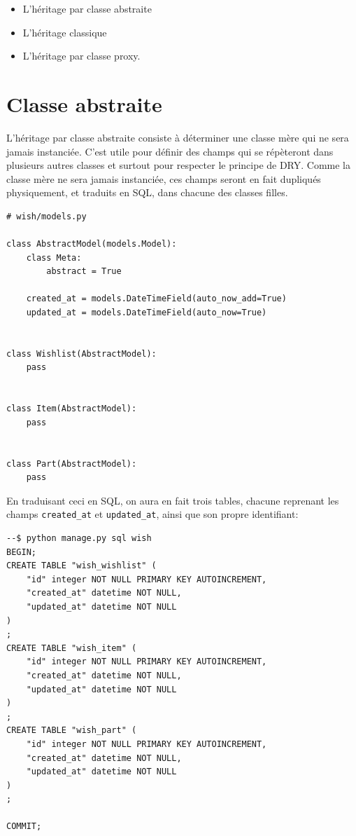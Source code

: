\documentclass[11pt]{amsbook}
\begin{document}
\begin{itemize}

\item L’héritage par classe abstraite

\item L’héritage classique

\item L’héritage par classe proxy.

\end{itemize}


\hypertarget{x-classe-abstraite}{\section{Classe abstraite}}
L’héritage par classe abstraite consiste à déterminer une classe mère qui ne sera jamais instanciée. C’est utile pour définir des champs qui se répèteront dans plusieurs autres classes et surtout pour respecter le principe de DRY. Comme la classe mère ne sera jamais instanciée, ces champs seront en fait dupliqués physiquement, et traduits en SQL, dans chacune des classes filles.


\begin{verbatim}
# wish/models.py

class AbstractModel(models.Model):
    class Meta:
        abstract = True

    created_at = models.DateTimeField(auto_now_add=True)
    updated_at = models.DateTimeField(auto_now=True)


class Wishlist(AbstractModel):
    pass


class Item(AbstractModel):
    pass


class Part(AbstractModel):
    pass
\end{verbatim}

En traduisant ceci en SQL, on aura en fait trois tables, chacune reprenant les champs \texttt{created\_at} et \texttt{updated\_at}, ainsi que son propre identifiant:


\begin{verbatim}
--$ python manage.py sql wish
BEGIN;
CREATE TABLE "wish_wishlist" (
    "id" integer NOT NULL PRIMARY KEY AUTOINCREMENT,
    "created_at" datetime NOT NULL,
    "updated_at" datetime NOT NULL
)
;
CREATE TABLE "wish_item" (
    "id" integer NOT NULL PRIMARY KEY AUTOINCREMENT,
    "created_at" datetime NOT NULL,
    "updated_at" datetime NOT NULL
)
;
CREATE TABLE "wish_part" (
    "id" integer NOT NULL PRIMARY KEY AUTOINCREMENT,
    "created_at" datetime NOT NULL,
    "updated_at" datetime NOT NULL
)
;

COMMIT;
\end{verbatim}
\end{document}
